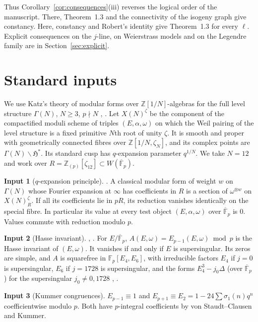 \documentclass[11pt,a4paper]{article}
\numberwithin{equation}{section}
\theoremstyle{definition}
\newtheorem{fact}{Input}
\theoremstyle{remark}
\newcommand{\Fp}{\mathbb F_p}
\newcommand{\Fb}{\overline{\mathbb F}_p}
\newcommand{\Z}{\mathbb Z}
\begin{document}
Thus Corollary~\ref{cor:consequences}(iii) reverses the logical order of the manuscript.
There, Theorem~1.3 and the connectivity of the isogeny graph give constancy. Here, constancy
and Robert's identity give Theorem~1.3 for every $\ell$. Explicit consequences on the $j$-line,
on Weierstrass models and on the Legendre family are in Section~\ref{sec:explicit}.

\section{Standard inputs}\label{sec:inputs}

We use Katz's theory of modular forms over $\Z[1/N]$-algebras for the full level structure
$\Gamma(N)$, $N\ge3$, $p\nmid N$ \cite[\S\S1.2--1.6]{Katz73}, \cite{DR73}. Let
$X(N)^{\zeta}$ be the component of the compactified moduli scheme of triples
$(E,\alpha,\omega)$ on which the Weil pairing of the level structure is a fixed primitive
$N$th root of unity $\zeta$. It is smooth and proper with geometrically connected fibres over
$\Z[1/N,\zeta_N]$, and its complex points are $\Gamma(N)\backslash\mathfrak H^*$. Its standard
cusp has $q$-expansion parameter $q^{1/N}$. We take $N=12$ and work over
$R=\Z_{(p)}[\zeta_{12}]\subset W(\Fb)$.

\begin{fact}[$q$-expansion principle]\label{in:qexp}
\cite[\S1.6]{Katz73}. A classical modular form of weight $w$ on $\Gamma(N)$ whose Fourier
expansion at $\infty$ has coefficients in $R$ is a section of $\omega^{\otimes w}$ on
$X(N)^\zeta_R$. If all its coefficients lie in $pR$, its reduction vanishes identically on
the special fibre. In particular its value at every test object $(E,\alpha,\omega)$ over
$\Fb$ is $0$. Values commute with reduction modulo $p$.
\end{fact}

\begin{fact}[Hasse invariant]\label{in:hasse}
\cite[\S2.1]{Katz73}, \cite{SerreBourbaki}. For $E/\Fb$, $A(E,\omega)=E_{p-1}(E,\omega)\bmod p$ is
the Hasse invariant of $(E,\omega)$. It vanishes if and only if $E$ is supersingular. Its
zeros are simple, and $A$ is squarefree in $\Fp[E_4,E_6]$, with irreducible factors
$E_4$ if $j=0$ is supersingular, $E_6$ if $j=1728$ is supersingular, and the forms
$E_4^3-j_0\Delta$ (over $\Fb$) for the supersingular $j_0\ne0,1728$
\cite[Theorem~1.2]{Baker98}, \cite[\S3 and \S10(a)]{KZ98}.
\end{fact}

\begin{fact}[Kummer congruences]\label{in:kummer}
$E_{p-1}\equiv1$ and $E_{p+1}\equiv E_2=1-24\sum\sigma_1(n)q^n$ coefficientwise modulo $p$.
Both have $p$-integral coefficients by von Staudt--Clausen and Kummer.
\end{fact}
\end{document}
